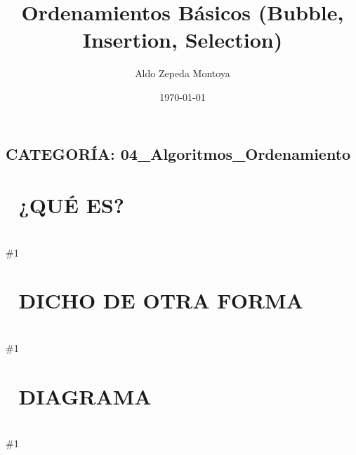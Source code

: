 \documentclass{article}
\newcommand{\quees}[1]{
    \section*{🤔 ¿QUÉ ES?}
    \hrulefill \\
    \#1
}
\newcommand{\dichodeotraforma}[1]{
    \section*{💬 DICHO DE OTRA FORMA}
    \hrulefill \\
    \#1
}
\newcommand{\diagrama}[1]{
    \section*{🎨 DIAGRAMA}
    \hrulefill \\
    \#1
}
\begin{document}
\title{Ordenamientos Básicos (Bubble, Insertion, Selection)}
\author{Aldo Zepeda Montoya}
\date{\today}
\maketitle

\subsection*{CATEGORÍA: 04\_Algoritmos\_Ordenamiento}

\quees{
Tres formas manuales de ordenar cosas en la vida real:

1. Bubble Sort 🫧 (Burbujas): Imagina burbujas subiendo en un refresco.
   Comparas dos elementos juntos; si el de la izquierda es mayor, lo
   cambias. Los números más grandes "burbujean" hacia el final en 
   cada pasada.

2. Insertion Sort 🃏 (Cartas): Como cuando ordenas cartas en tu mano.
   Tomas una carta nueva y la vas comparando con las que ya tienes
   ordenadas hasta que encuentras su lugar exacto y la "insertas".

3. Selection Sort 🔍 (Selección): Buscas el objeto más pequeño de 
   todo el grupo y lo pones al principio. Luego buscas el más pequeño
   de los que quedan y lo pones en segundo lugar, y así...
}

\dichodeotraforma{
Son algoritmos de ordenamiento O(n^2). Aunque son lentos para grandes
cantidades de datos, son fundamentales para entender la lógica de 
sorting.

- Bubble Sort: Se basa en intercambios adyacentes.
- Insertion Sort: Divide el array en una parte ordenada y otra no. 
  Es muy eficiente para arrays que ya están casi ordenados.
- Selection Sort: Se basa en encontrar el mínimo en cada iteración.
}

\diagrama{\begin{verbatim}
Bubble Sort (Paso 1):
[64, 34, 25, 12] -> 64 > 34? SÍ -> [34, 64, 25, 12]
[34, 64, 25, 12] -> 64 > 25? SÍ -> [34, 25, 64, 12]
[34, 25, 64, 12] -> 64 > 12? SÍ -> [34, 25, 12, 64]* (64 ya está al final)

Insertion Sort (Paso 2 - ordenando el 25):
Mano: [34, 64] | Pendiente: [25, 12]
Tomo el 25. ¿25 < 64? SÍ. ¿25 < 34? SÍ.
Mano: [25, 34, 64] | Pendiente: [12]

Selection Sort (Paso 1):
[64, 34, 25, 12] -> Mínimo es 12.
Intercambio 64 y 12 -> [12, 34, 25, 64]
\end{verbatim}}
\end{document}
